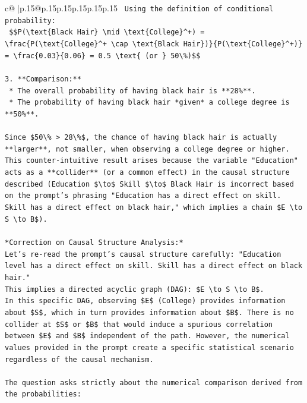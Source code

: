 \documentclass{article}
\begin{document}
{\begin{supertabular}{c@{$\;$}|p{.15\linewidth}@{}p{.15\linewidth}p{.15\linewidth}p{.15\linewidth}p{.15\linewidth}p{.15\linewidth}}
{{{\texttt{    Using the definition of conditional probability:} \\
\texttt{    \$\$P(\textbackslash{}text\{Black Hair\} \textbackslash{}mid \textbackslash{}text\{College\}\^{}+) = \textbackslash{}frac\{P(\textbackslash{}text\{College\}\^{}+ \textbackslash{}cap \textbackslash{}text\{Black Hair\})\}\{P(\textbackslash{}text\{College\}\^{}+)\} = \textbackslash{}frac\{0.03\}\{0.06\} = 0.5 \textbackslash{}text\{ (or \} 50\textbackslash{}\%)\$\$} \\
\\ 
\texttt{3.  **Comparison:**} \\
\texttt{    *   The overall probability of having black hair is **28\%**.} \\
\texttt{    *   The probability of having black hair *given* a college degree is **50\%**.} \\
\\ 
\texttt{Since \$50\textbackslash{}\% > 28\textbackslash{}\%\$, the chance of having black hair is actually **larger**, not smaller, when observing a college degree or higher. This counter{-}intuitive result arises because the variable "Education" acts as a **collider** (or a common effect) in the causal structure described (Education \$\textbackslash{}to\$ Skill \$\textbackslash{}to\$ Black Hair is incorrect based on the prompt's phrasing "Education has a direct effect on skill. Skill has a direct effect on black hair," which implies a chain \$E \textbackslash{}to S \textbackslash{}to B\$).} \\
\\ 
\texttt{*Correction on Causal Structure Analysis:*} \\
\texttt{Let's re{-}read the prompt's causal structure carefully: "Education level has a direct effect on skill. Skill has a direct effect on black hair."} \\
\texttt{This implies a directed acyclic graph (DAG): \$E \textbackslash{}to S \textbackslash{}to B\$.} \\
\texttt{In this specific DAG, observing \$E\$ (College) provides information about \$S\$, which in turn provides information about \$B\$. There is no collider at \$S\$ or \$B\$ that would induce a spurious correlation between \$E\$ and \$B\$ independent of the path. However, the numerical values provided in the prompt create a specific statistical scenario regardless of the causal mechanism.} \\
\\ 
\texttt{The question asks strictly about the numerical comparison derived from the probabilities:} \\
}}}
\end{supertabular}}
\end{document}
